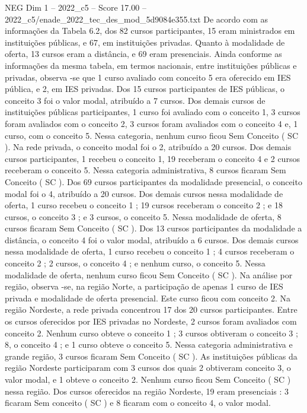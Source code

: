 \begin{textsample}{NEG Dim 1 – 2022\_c5 – Score 17.00 – 2022\_c5/enade\_2022\_tec\_des\_mod\_5d9084e355.txt}
De acordo com as informações da Tabela 6.2, dos 82 cursos participantes, 15 eram ministrados em instituições públicas, e 67, em instituições privadas.
Quanto à modalidade de oferta, 13 cursos eram a distância, e 69 eram presenciais.
Ainda conforme as informações da mesma tabela, em termos nacionais, entre instituições públicas e privadas, observa -se que 1 curso avaliado com conceito 5 era oferecido em IES pública, e 2, em IES privadas.
Dos 15 cursos participantes de IES públicas, o conceito 3 foi o valor modal, atribuído a 7 cursos.
Dos demais cursos de instituições públicas participantes, 1 curso foi avaliado com o conceito 1, 3 cursos foram avaliados com o conceito 2, 3 cursos foram avaliados com o conceito 4 e, 1 curso, com o conceito 5.
Nessa categoria, nenhum curso ficou Sem Conceito ( SC ).
Na rede privada, o conceito modal foi o 2, atribuído a 20 cursos.
Dos demais cursos participantes, 1 recebeu o conceito 1, 19 receberam o conceito 4 e 2 cursos receberam o conceito 5.
Nessa categoria administrativa, 8 cursos ficaram Sem Conceito ( SC ).
Dos 69 cursos participantes da modalidade presencial, o conceito modal foi o 4, atribuído a 20 cursos.
Dos demais cursos nessa modalidade de oferta, 1 curso recebeu o conceito 1 ; 19 cursos receberam o conceito 2 ; e 18 cursos, o conceito 3 ; e 3 cursos, o conceito 5.
Nessa modalidade de oferta, 8 cursos ficaram Sem Conceito ( SC ).
Dos 13 cursos participantes da modalidade a distância, o conceito 4 foi o valor modal, atribuído a 6 cursos.
Dos demais cursos nessa modalidade de oferta, 1 curso recebeu o conceito 1 ; 4 cursos receberam o conceito 2 ; 2 cursos, o conceito 4 ; e nenhum curso, o conceito 5.
Nessa modalidade de oferta, nenhum curso ficou Sem Conceito ( SC ).
Na análise por região, observa -se, na região Norte, a participação de apenas 1 curso de IES privada e modalidade de oferta presencial.
Este curso ficou com conceito 2.
Na região Nordeste, a rede privada concentrou 17 dos 20 cursos participantes.
Entre os cursos oferecidos por IES privadas no Nordeste, 2 cursos foram avaliados com conceito 2.
Nenhum curso obteve o conceito 1 ; 3 cursos obtiveram o conceito 3 ; 8, o conceito 4 ; e 1 curso obteve o conceito 5.
Nessa categoria administrativa e grande região, 3 cursos ficaram Sem Conceito ( SC ).
As instituições públicas da região Nordeste participaram com 3 cursos dos quais 2 obtiveram conceito 3, o valor modal, e 1 obteve o conceito 2.
Nenhum curso ficou Sem Conceito ( SC ) nessa região.
Dos cursos oferecidos na região Nordeste, 19 eram presenciais : 3 ficaram Sem conceito ( SC ) e 8 ficaram com o conceito 4, o valor modal.

\end{textsample}
